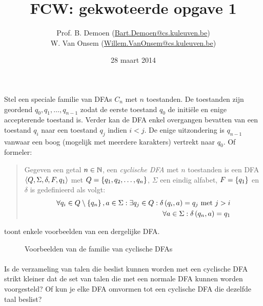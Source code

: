 \documentclass{article}
\title{FCW: gekwoteerde opgave 1}
\author{Prof. B. Demoen (\url{Bart.Demoen@cs.kuleuven.be})\\ W. Van Onsem (\url{Willem.VanOnsem@cs.kuleuven.be})}
\date{28 maart 2014}
\begin{document}
\maketitle
\richtlijnen{}
\aboutanswers{}
\begin{question} Stel een speciale familie van DFAs $C_n$ met $n$ toestanden. De toestanden zijn geordend $q_0,q_1,\ldots,q_{n-1}$ zodat de eerste toestand $q_0$ de initi\"ele en enige accepterende toestand is. Verder kan de DFA enkel overgangen bevatten van een toestand $q_i$ naar een toestand $q_j$ indien $i<j$. De enige uitzondering is $q_{n-1}$ vanwaar een boog (mogelijk met meerdere karakters) vertrekt naar $q_0$. Of formeler:
\begin{quote}\begin{definition}
Gegeven een getal $n\in\mathbb{N}$, een \emph{cyclische DFA} met $n$ toestanden is een DFA $\left\langle Q,\Sigma,\delta,F,q_1 \right\rangle$ met $Q=\left\{ q_1,q_2,\ldots,q_n \right\}$, $\Sigma$ een eindig alfabet, $F=\left\{ q_1 \right\}$ en $\delta$ is gedefinieerd als volgt:
\begin{eqnarray}
\forall q_i\in Q\setminus\left\{ q_n \right\},a\in\Sigma:\exists q_j\in Q:\delta\left( q_i,a \right)=q_j\mbox{ met } j>i\\
\forall a\in\Sigma:\delta\left( q_n,a \right)=q_1
\end{eqnarray}
\end{definition}\end{quote}
\begin{example}
 toont enkele voorbeelden van een dergelijke DFA.
\begin{figure}[hbt]
\centering
{}
\caption{Voorbeelden van de familie van cyclische DFAs}
\end{figure}
\end{example}
\paragraph{}
Is de verzameling van talen die beslist kunnen worden met een cyclische DFA strikt kleiner dat de set van talen die met een normale DFA kunnen worden voorgesteld? Of kun je elke DFA omvormen tot een cyclische DFA die dezelfde taal beslist?
\end{question}
\end{document}
